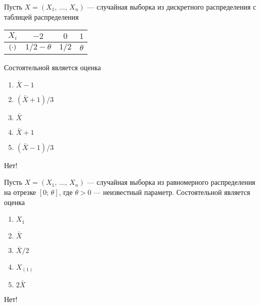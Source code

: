 \documentclass[t]{beamer}
\let\P\relax
\DeclareMathOperator{\P}{\mathbb{P}}
\begin{document}
 \begin{frame} \label{28-No} 
\begin{block}{28} 

    Пусть $X = (X_1, \, \ldots, \, X_n)$ — случайная выборка из дискретного распределения с таблицей распределения

  \begin{center}
	\begin{tabular}{cccc}
		\toprule
		$X_i$    & $-2$     & $0$   & $1$  \\
		\midrule
		$\P(\cdot)$        & $1/2 - \theta$      & $1/2$    & $\theta$  \\
		\bottomrule
	\end{tabular}
\end{center}

Состоятельной является оценка


 \end{block} 
\begin{enumerate} 
\item[] \hyperlink{28-No}{\beamergotobutton{} $\bar{X} - 1$}
\item[] \hyperlink{28-Yes}{\beamergotobutton{} $(\bar{X} + 1) / 3$}
\item[] \hyperlink{28-No}{\beamergotobutton{} $\bar{X}$}
\item[] \hyperlink{28-No}{\beamergotobutton{} $\bar{X} + 1$}
\item[] \hyperlink{28-No}{\beamergotobutton{} $(\bar{X} - 1) / 3$}
\end{enumerate} 

 \alert{Нет!} 
\end{frame} 


 \begin{frame} \label{29-No} 
\begin{block}{29} 

  Пусть $X = (X_1, \, \ldots, \, X_n)$ — случайная выборка из равномерного распределения на отрезке $[0; \, \theta]$, где $\theta > 0$ — неизвестный параметр.
  Состоятельной является оценка


 \end{block} 
\begin{enumerate} 
\item[] \hyperlink{29-No}{\beamergotobutton{} $X_1$}
\item[] \hyperlink{29-No}{\beamergotobutton{} $\bar{X}$}
\item[] \hyperlink{29-No}{\beamergotobutton{} $\bar{X} / 2$}
\item[] \hyperlink{29-No}{\beamergotobutton{} $X_{(1)}$}
\item[] \hyperlink{29-Yes}{\beamergotobutton{} $2 \bar{X}$}
\end{enumerate} 

 \alert{Нет!} 
\end{frame} 
\end{document}
